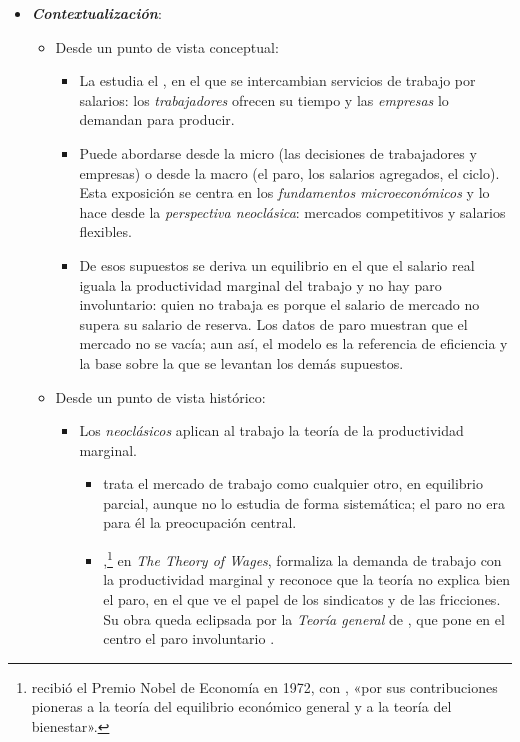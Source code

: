 \documentclass[11pt]{article}
\begin{document}
\begin{itemize}
\item \textbf{\emph{Contextualización}}:
  \begin{itemize}
  \item Desde un punto de vista conceptual:
  \begin{itemize}
  \item La  estudia el , en el que se intercambian servicios de trabajo por salarios: los \emph{trabajadores} ofrecen su tiempo y las \emph{empresas} lo demandan para producir.
  \item Puede abordarse desde la micro (las decisiones de trabajadores y empresas) o desde la macro (el paro, los salarios agregados, el ciclo). Esta exposición se centra en los \emph{fundamentos microeconómicos} y lo hace desde la \emph{perspectiva neoclásica}: mercados competitivos y salarios flexibles.
  \item De esos supuestos se deriva un equilibrio en el que el salario real iguala la productividad marginal del trabajo y no hay paro involuntario: quien no trabaja es porque el salario de mercado no supera su salario de reserva. Los datos de paro muestran que el mercado no se vacía; aun así, el modelo es la referencia de eficiencia y la base sobre la que se levantan los demás supuestos.
  \end{itemize}
  \item Desde un punto de vista histórico:
  \begin{itemize}
  \item Los \emph{neoclásicos} aplican al trabajo la teoría de la productividad marginal.
    \begin{itemize}
    \item \textcite{Marshall1890Principles} trata el mercado de trabajo como cualquier otro, en equilibrio parcial, aunque no lo estudia de forma sistemática; el paro no era para él la preocupación central.
    \item \textcite{Hicks1932Theory},\footnote{ recibió el Premio Nobel de Economía en 1972, con , «por sus contribuciones pioneras a la teoría del equilibrio económico general y a la teoría del bienestar»\nocite{Nobel1972HicksArrow}.} en \emph{The Theory of Wages}, formaliza la demanda de trabajo con la productividad marginal y reconoce que la teoría no explica bien el paro, en el que ve el papel de los sindicatos y de las fricciones. Su obra queda eclipsada por la \emph{Teoría general} de \textcite{Keynes1936}, que pone en el centro el paro involuntario .

\end{itemize}
\end{itemize}
\end{itemize}
\end{itemize}
\end{document}
